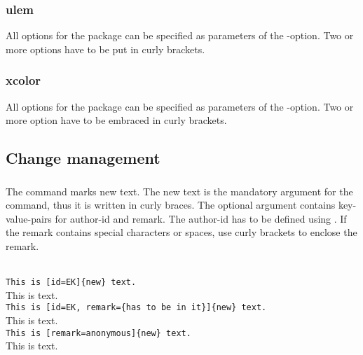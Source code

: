 \subsubsection{ulem}

All options for the  package can be specified as parameters of the -option.
Two or more options have to be put in curly brackets.




\subsubsection{xcolor}

All options for the  package can be specified as parameters of the -option.
Two or more option have to be embraced in curly brackets.




\subsection{Change management}
\label{sec:user:changemanagement}

\subsubsection{}
\DescribeMacro{\added}

The command  marks new text.
The new text is the mandatory argument for the command, thus it is written in curly braces.
The optional argument contains key-value-pairs for author-id and remark.
The author-id has to be defined using .
If the remark contains special characters or spaces, use curly brackets to enclose the remark.

\begin{chusage}
		\>\\
	\usageexample
		\>\texttt{This is [id=EK]\{new\} text.}\\
		\>This is  text.\\
		\>\texttt{This is [id=EK, remark=\{has to be in it\}]\{new\} text.}\\
		\>This is  text.\\
		\>\texttt{This is [remark=anonymous]\{new\} text.}\\
		\>This is  text.
\end{chusage}


